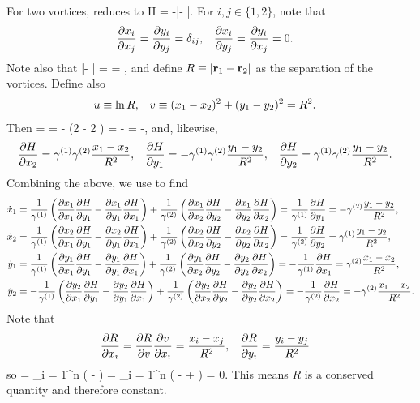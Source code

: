 \begin{solution}
	For two vortices,  reduces to
	\beq
		H = -\gamq \gamw \ln|\vrq - \vrw|.
	\eeq
	For $i, j \in \{ 1, 2 \}$, note that
	\begin{align*}
		\pdv{x_i}{x_j} &= \pdv{y_i}{y_j} = \delta_{ij}, &
		\pdv{x_i}{y_j} &= \pdv{y_i}{x_j} = 0.
	\end{align*}
	Note also that
	\beq
		|\vrq - \vrw| = 
		= ,
	\eeq
	and define $R \equiv |\mathbf{r}_1 - \mathbf{r}_2|$ as the separation of the vortices.  Define also
	\begin{align*}
		u &\equiv \ln{R}, &
		v &\equiv (x_1 - x_2)^2 + (y_1 - y_2)^2 = R^2.
	\end{align*}
	 Then
	\beq
		 =    
		= -\gamq \gamw {}  (2 \xq - 2 \xw)
		= -\gamq \gamw {}
		= -\gamq \gamw {},
	\eeq
	and, likewise,
	\begin{align*}
		\pdv{H}{x_2} &= \gamma^{(1)} \gamma^{(2)} \frac{x_1 - x_2}{R^2}, &
		\pdv{H}{y_1} &= -\gamma^{(1)} \gamma^{(2)} \frac{y_1 - y_2}{R^2}, &
		\pdv{H}{y_2} &= \gamma^{(1)} \gamma^{(2)} \frac{y_1 - y_2}{R^2}.
	\end{align*}
	Combining the above, we use  to find
	\begin{align}
		\dot{x}_1 &= \frac{1}{\gamma^{(1)}} \left( \pdv{x_1}{x_1} \pdv{H}{y_1} - \pdv{x_1}{y_1} \pdv{H}{x_1} \right) + \frac{1}{\gamma^{(2)}} \left( \pdv{x_1}{x_2} \pdv{H}{y_2} - \pdv{x_1}{y_2} \pdv{H}{x_2} \right)
		= \frac{1}{\gamma^{(1)}} \pdv{H}{y_1}
		= -\gamma^{(2)} \frac{y_1 - y_2}{R^2}, \label{4eqns1} \\
		\dot{x}_2 &= \frac{1}{\gamma^{(1)}} \left( \pdv{x_2}{x_1} \pdv{H}{y_1} - \pdv{x_2}{y_1} \pdv{H}{x_1} \right) + \frac{1}{\gamma^{(2)}} \left( \pdv{x_2}{x_2} \pdv{H}{y_2} - \pdv{x_2}{y_2} \pdv{H}{x_2} \right)
		= \frac{1}{\gamma^{(2)}} \pdv{H}{y_2}
		= \gamma^{(1)} \frac{y_1 - y_2}{R^2},  \label{4eqns2} \\
		\dot{y}_1 &= \frac{1}{\gamma^{(1)}} \left( \pdv{y_1}{x_1} \pdv{H}{y_1} - \pdv{y_1}{y_1} \pdv{H}{x_1} \right) + \frac{1}{\gamma^{(2)}} \left( \pdv{y_1}{x_2} \pdv{H}{y_2} - \pdv{y_2}{y_2} \pdv{H}{x_2} \right)
		= -\frac{1}{\gamma^{(1)}} \pdv{H}{x_1}
		= \gamma^{(2)} \frac{x_1 - x_2}{R^2},  \label{4eqns3} \\
		\dot{y}_2 &= -\frac{1}{\gamma^{(1)}} \left( \pdv{y_2}{x_1} \pdv{H}{y_1} - \pdv{y_2}{y_1} \pdv{H}{x_1} \right) + \frac{1}{\gamma^{(2)}} \left( \pdv{y_2}{x_2} \pdv{H}{y_2} - \pdv{y_2}{y_2} \pdv{H}{x_2} \right)
		= -\frac{1}{\gamma^{(2)}} \pdv{H}{x_2}
		= -\gamma^{(2)} \frac{x_1 - x_2}{R^2}. \label{4eqns4}
	\end{align}
	Note that
	\begin{align*}
		\pdv{R}{x_i} &= \pdv{R}{v} \pdv{v}{x_i}
		= \frac{x_i - x_j}{R^2}, &
		\pdv{R}{y_i} &= \frac{y_i - y_j}{R^2}
	\end{align*}
	so
	\beq
		[H, R] = \sum_{i = 1}^n  \left(   -   \right)
		= \sum_{i = 1}^n  \left( -\gami \gamj {}  + \gami \gamj {}  \right)
		= 0.
	\eeq
	This means $R$ is a conserved quantity and therefore constant.


\end{solution}
